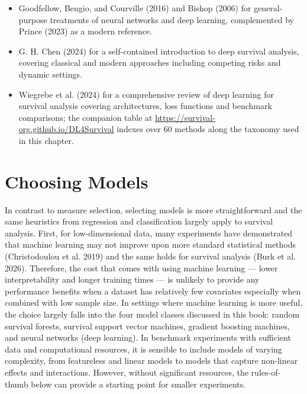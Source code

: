 \documentclass[
  letterpaper,
  krantz2]{style/krantz}
\providecommand{\tightlist}{%
  \setlength{\itemsep}{0pt}\setlength{\parskip}{0pt}}
\begin{document}
\begin{tcolorbox}[enhanced jigsaw, toprule=.15mm, bottomtitle=1mm, opacityback=0, breakable, leftrule=.75mm, title={Further reading}, toptitle=1mm, bottomrule=.15mm, colback=white, colframe=quarto-callout-tip-color-frame, titlerule=0mm, opacitybacktitle=0.6, coltitle=black, rightrule=.15mm, left=2mm, colbacktitle=quarto-callout-tip-color!10!white, arc=.35mm]

\begin{itemize}
\tightlist
\item
  Goodfellow, Bengio, and Courville (2016) and Bishop (2006) for
  general-purpose treatments of neural networks and deep learning,
  complemented by Prince (2023) as a modern reference.
\item
  G. H. Chen (2024) for a self-contained introduction to deep survival
  analysis, covering classical and modern approaches including competing
  risks and dynamic settings.
\item
  Wiegrebe et al. (2024) for a comprehensive review of deep learning for
  survival analysis covering architectures, loss functions and benchmark
  comparisons; the companion table at
  \url{https://survival-org.github.io/DL4Survival} indexes over 60
  methods along the taxonomy used in this chapter.
\end{itemize}

\end{tcolorbox}

\chapter{Choosing Models}\label{sec-choosing-models}

In contrast to measure selection, selecting models is more
straightforward and the same heuristics from regression and
classification largely apply to survival analysis. First, for
low-dimensional data, many experiments have
demonstrated that machine learning may not improve upon more standard
statistical methods (Christodoulou et al. 2019) and the same holds for
survival analysis (Burk et al. 2026). Therefore, the cost that comes
with using machine learning --- lower interpretability and longer
training times --- is unlikely to provide any performance benefits when
a dataset has relatively few covariates especially when combined with
low sample size. In settings where machine learning is more useful, the
choice largely falls into the four model classes discussed in this book:
random survival forests, survival support vector machines, gradient
boosting machines, and neural networks (deep learning). In benchmark
experiments with sufficient data and computational resources, it is
sensible to include models of varying complexity, from featureless and
linear models to models that capture non-linear effects and
interactions. However, without significant resources, the rules-of-thumb
below can provide a starting point for smaller experiments.
\end{document}
